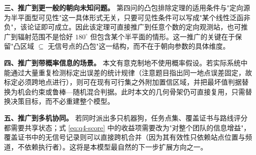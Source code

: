 \textbf{三、推广到更一般的朝向未知问题。} 第四问的凸包排除定理的适用条件与"定向源为半平面型可见性"这一具体形式无关，只要可见性条件可以写成"某个线性泛函非负"，该论证即可成立。因此该定理可直接推广到任意个数的定向观测站，也可推广到辐射范围不是恰好 $180^\circ$ 但包含某个半平面的情形。这一推广的关键在于保留"凸区域 $\subseteq$ 无信号点的凸包"这一结构，而不在于朝向参数的具体维度。

\textbf{四、推广到带概率信息的场景。} 本文有意克制地不使用概率假设。若实际系统中能通过大量重复检测标定出误差的统计规律（注意题目指出同一地点误差固定，故标定必须跨地点进行），则可在现有可行集之外附加置信区域，并把最坏值判据替换为机会约束或鲁棒—随机混合判据。此时本文的几何骨架仍可直接复用，只需替换决策目标，而不必重建整个模型。

\textbf{五、推广到多机协同。} 若同时派出多只机器狗，任务点集、覆盖证书与路线评分都需要共享状态；式 \eqref{eq:q4-score} 中的收益项需要改为"对整个团队的信息增益"，覆盖证书中的无信号记录则可以直接跨机合并（因为其有效性只依赖站点位置与频道，不依赖执行者）。这将是本模型最自然的下一步扩展方向之一。
